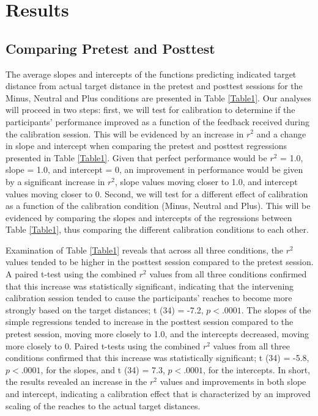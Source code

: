 \section{Results}
\subsection{Comparing Pretest and Posttest}
The average slopes and intercepts of the functions predicting indicated target distance from actual target distance in the pretest and posttest sessions for the Minus, Neutral and Plus conditions are presented in Table \ref{Table1}. Our analyses will proceed in two steps: first, we will test for calibration to determine if the participants' performance improved as a function of the feedback received during the calibration session. This will be evidenced by an increase in $r^2$ and a change in slope and intercept when comparing the pretest and posttest regressions presented in Table \ref{Table1}. Given that perfect performance would be $r^2$ = 1.0, slope = 1.0, and intercept = 0, an improvement in performance would be given by a significant increase in $r^2$, slope values moving closer to 1.0, and intercept values moving closer to 0. Second, we will test for a different effect of calibration as a function of the calibration condition (Minus, Neutral and Plus). This will be evidenced by comparing the slopes and intercepts of the regressions between Table \ref{Table1}, thus comparing the different calibration conditions to each other.


Examination of Table \ref{Table1} reveals that across all three conditions, the $r^2$ values tended to be higher in the posttest session compared to the pretest session. A paired t-test using the combined $r^2$ values from all three conditions confirmed that this increase was statistically significant, indicating that the intervening calibration session tended to cause the participants' reaches to become more strongly based on the target distances; t (34) = -7.2, $p < .0001$. The slopes of the simple regressions tended to increase in the posttest session compared to the pretest session, moving more closely to 1.0, and the intercepts decreased, moving more closely to 0. Paired t-tests using the combined $r^2$ values from all three conditions confirmed that this increase was statistically significant; t (34) = -5.8, $p < .0001$, for the slopes, and t (34) = 7.3, $p < .0001$, for the intercepts. In short, the results revealed an increase in the $r^2$ values and improvements in both slope and intercept, indicating a calibration effect that is characterized by an improved scaling of the reaches to the actual target distances.

